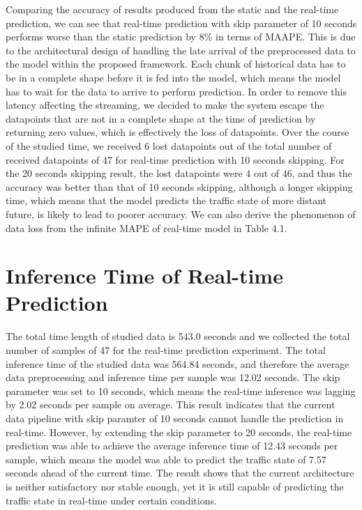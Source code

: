 \documentclass[11pt]{uonthesis}
\begin{document}
Comparing the accuracy of results produced from the static and the real-time prediction, we can see that real-time prediction with skip parameter of 10 seconds performs worse than the static prediction by 8\% in terms of MAAPE. This is due to the architectural design of handling the late arrival of the preprocessed data to the model within the proposed framework. Each chunk of historical data has to be in a complete shape before it is fed into the model, which means the model has to wait for the data to arrive to perform prediction. In order to remove this latency affecting the streaming, we decided to make the system escape the datapoints that are not in a complete shape at the time of prediction by returning zero values, which is effectively the loss of datapoints. Over the course of the studied time, we received 6 lost datapoints out of the total number of received datapoints of 47 for real-time prediction with 10 seconds skipping. For the 20 seconds skipping result, the lost datapoints were 4 out of 46, and thus the accuracy was better than that of 10 seconds skipping, although a longer skipping time, which means that the model predicts the traffic state of more distant future, is likely to lead to poorer accuracy. We can also derive the phenomenon of data loss from the infinite MAPE of real-time model in Table 4.1. %

\section{Inference Time of Real-time Prediction}

The total time length of studied data is 543.0 seconds and we collected the total number of samples of 47 for the real-time prediction experiment. The total inference time of the studied data was 564.84 seconds, and therefore the average data preprocessing and inference time per sample was 12.02 seconds. The skip parameter was set to 10 seconds, which means the real-time inference was lagging by 2.02 seconds per sample on average. This result indicates that the current data pipeline with skip paramter of 10 seconds cannot handle the prediction in real-time. However, by extending the skip parameter to 20 seconds, the real-time prediction was able to achieve the average inference time of 12.43 seconds per sample, which means the model was able to predict the traffic state of 7.57 seconds ahead of the current time. The result shows that the current architecture is neither satisfactory nor stable enough, yet it is still capable of predicting the traffic state in real-time under certain conditions. %
\end{document}
